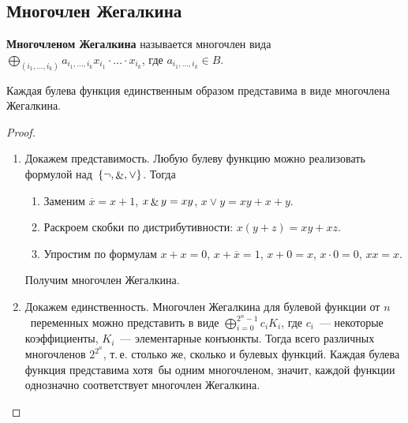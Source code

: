 \subsection{Многочлен Жегалкина}
 \textbf{Многочленом Жегалкина} называется многочлен вида
$\bigoplus_{(i_1, \ldots, i_k)} a_{i_1, \ldots, i_k} x_{i_1} \cdot \ldots \cdot x_{i_k}$, где $a_{i_1, \ldots, i_k} \in B$.

\begin{theorem}[Жегалкина]
Каждая булева функция единственным образом представима в виде многочлена Жегалкина.
\end{theorem}
\begin{proof}
\begin{enumerate}
	\item Докажем представимость.
	Любую булеву функцию можно реализовать формулой над~$\{ \neg, \mathop{\&}, \lor \}$.
	Тогда
	\begin{enumerate}
		\item Заменим $\overline x = x + 1$, $x \mathop{\&} y = xy$, $x \lor y = xy + x + y$.
		\item Раскроем скобки по дистрибутивности: $x(y + z) = xy + xz$.
		\item Упростим по формулам $x + x = 0$, $x + \overline x = 1$, $x + 0 = x$, $x \cdot 0 = 0$, $xx = x$.
	\end{enumerate}
	
	Получим многочлен Жегалкина.
	
	\item Докажем единственность.
	Многочлен Жегалкина для булевой функции от $n$~переменных можно представить в виде $\displaystyle \bigoplus_{i=0}^{2^n-1} c_i K_i$, где $c_i$~--- некоторые коэффициенты, $K_i$~--- элементарные конъюнкты.
	Тогда всего различных многочленов $2^{2^n}$, т.\,е. столько же, сколько и булевых функций.
	Каждая булева функция представима хотя~бы одним многочленом, значит, каждой функции однозначно соответствует многочлен Жегалкина.
\end{enumerate}
\end{proof}

